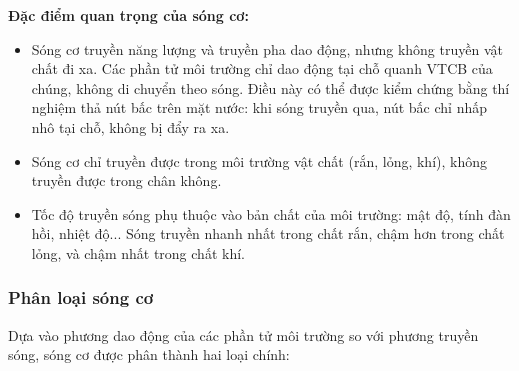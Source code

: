 \textbf{Đặc điểm quan trọng của sóng cơ:}
\begin{itemize}
    \item Sóng cơ truyền năng lượng và truyền pha dao động, nhưng không truyền vật chất đi xa. Các phần tử môi trường chỉ dao động tại chỗ quanh VTCB của chúng, không di chuyển theo sóng. Điều này có thể được kiểm chứng bằng thí nghiệm thả nút bấc trên mặt nước: khi sóng truyền qua, nút bấc chỉ nhấp nhô tại chỗ, không bị đẩy ra xa.
    \item Sóng cơ chỉ truyền được trong môi trường vật chất (rắn, lỏng, khí), không truyền được trong chân không.
    \item Tốc độ truyền sóng phụ thuộc vào bản chất của môi trường: mật độ, tính đàn hồi, nhiệt độ... Sóng truyền nhanh nhất trong chất rắn, chậm hơn trong chất lỏng, và chậm nhất trong chất khí.
\end{itemize}

\subsubsection{Phân loại sóng cơ}

Dựa vào phương dao động của các phần tử môi trường so với phương truyền sóng, sóng cơ được phân thành hai loại chính:

